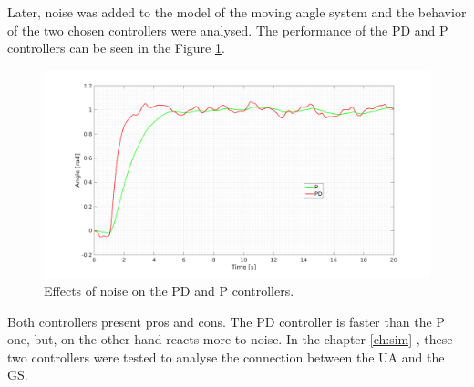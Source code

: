 Later, noise was added to the model of the moving angle system and the behavior of the two chosen controllers were analysed. The performance of the PD and P controllers can be seen in the Figure \ref{fig:noise_PID}.

\begin{figure}[H]
\centerline{
\includegraphics[scale=0.35]{figures/PD_noise.png}}
\caption{Effects of noise on the PD and P controllers.}
\label{fig:noise_PID}
\end{figure}

Both controllers present pros and cons. The PD controller is faster than the P one, but, on the other hand reacts more to noise. In the chapter \ref{ch:sim} , these two controllers were tested to analyse the connection between the UA and the GS.